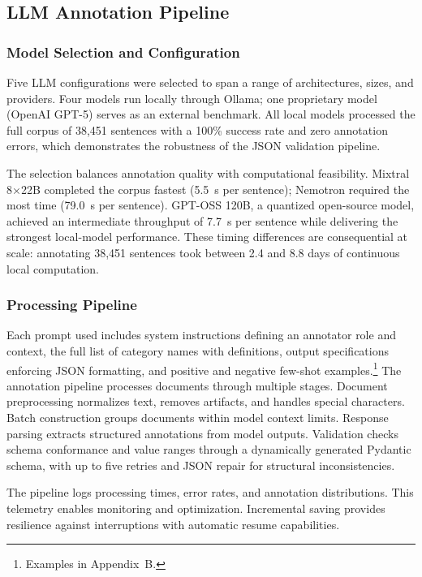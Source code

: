 \documentclass[12pt]{article}
\begin{document}
\subsection{LLM Annotation Pipeline}

\subsubsection{Model Selection and Configuration}

Five LLM configurations were selected to span a range of architectures, sizes, and providers. Four models run locally through Ollama; one proprietary model (OpenAI GPT-5) serves as an external benchmark. All local models processed the full corpus of 38,451 sentences with a 100\% success rate and zero annotation errors, which demonstrates the robustness of the JSON validation pipeline.



The selection balances annotation quality with computational feasibility. Mixtral 8$\times$22B completed the corpus fastest (5.5~s per sentence); Nemotron required the most time (79.0~s per sentence). GPT-OSS 120B, a quantized open-source model, achieved an intermediate throughput of 7.7~s per sentence while delivering the strongest local-model performance. These timing differences are consequential at scale: annotating 38,451 sentences took between 2.4 and 8.8 days of continuous local computation.

\subsubsection{Processing Pipeline}

Each prompt used includes system instructions defining an annotator role and context, the full list of category names with definitions, output specifications enforcing JSON formatting, and positive and negative few-shot examples.\footnote{Examples in Appendix~B.} The annotation pipeline processes documents through multiple stages. Document preprocessing normalizes text, removes artifacts, and handles special characters. Batch construction groups documents within model context limits. Response parsing extracts structured annotations from model outputs. Validation checks schema conformance and value ranges through a dynamically generated Pydantic schema, with up to five retries and JSON repair for structural inconsistencies.

The pipeline logs processing times, error rates, and annotation distributions. This telemetry enables monitoring and optimization. Incremental saving provides resilience against interruptions with automatic resume capabilities.
\end{document}
